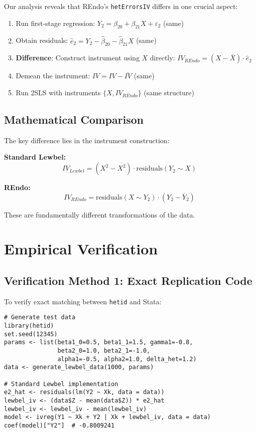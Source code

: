 \documentclass[12pt]{article}
\begin{document}
Our analysis reveals that REndo's \texttt{hetErrorsIV} differs in one crucial aspect:

\begin{enumerate}
\item Run first-stage regression: $Y_2 = \beta_{20} + \beta_{21}X + \varepsilon_2$ (same)
\item Obtain residuals: $\hat{e}_2 = Y_2 - \hat{\beta}_{20} - \hat{\beta}_{21}X$ (same)
\item \textbf{Difference}: Construct instrument using $X$ directly: $IV_{REndo} = (X - \bar{X}) \cdot \hat{e}_2$
\item Demean the instrument: $IV = IV - \overline{IV}$ (same)
\item Run 2SLS with instruments $\{X, IV_{REndo}\}$ (same structure)
\end{enumerate}

\subsection{Mathematical Comparison}

The key difference lies in the instrument construction:

\textbf{Standard Lewbel:}
\begin{equation}
IV_{Lewbel} = (X^2 - \overline{X^2}) \cdot \text{residuals}(Y_2 \sim X)
\end{equation}

\textbf{REndo:}
\begin{equation}
IV_{REndo} = \text{residuals}(X \sim Y_2) \cdot (Y_2 - \bar{Y}_2)
\end{equation}

These are fundamentally different transformations of the data.

\section{Empirical Verification}

\subsection{Verification Method 1: Exact Replication Code}

To verify exact matching between \texttt{hetid} and Stata:

\begin{lstlisting}[caption={R code for hetid implementation}]
# Generate test data
library(hetid)
set.seed(12345)
params <- list(beta1_0=0.5, beta1_1=1.5, gamma1=-0.8,
               beta2_0=1.0, beta2_1=-1.0,
               alpha1=-0.5, alpha2=1.0, delta_het=1.2)
data <- generate_lewbel_data(1000, params)

# Standard Lewbel implementation
e2_hat <- residuals(lm(Y2 ~ Xk, data = data))
lewbel_iv <- (data$Z - mean(data$Z)) * e2_hat
lewbel_iv <- lewbel_iv - mean(lewbel_iv)
model <- ivreg(Y1 ~ Xk + Y2 | Xk + lewbel_iv, data = data)
coef(model)["Y2"]  # -0.8009241
\end{lstlisting}
\end{document}
